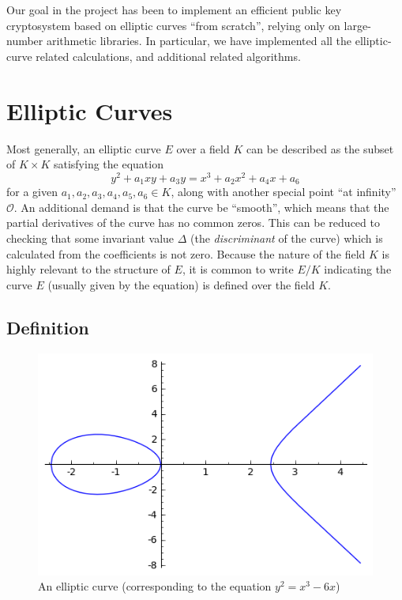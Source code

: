 \documentclass[11pt,english]{article}
\begin{document}
Our goal in the project has been to implement an efficient public key cryptosystem based on elliptic curves ``from scratch'', relying only on large-number arithmetic
libraries. In particular, we have implemented all the elliptic-curve related calculations, and additional related algorithms.

\section{Elliptic Curves}
Most generally, an elliptic curve $E$ over a field $K$ can be described as the subset of $K\times K$ satisfying the equation $$y^2+a_1xy+a_3y=x^3+a_2x^2+a_4x+a_6$$ 
for a given $a_1,a_2,a_3,a_4,a_5,a_6\in K$, along with another special point ``at infinity'' $\mathcal{O}$. An additional demand is that the curve be ``smooth'',
which means that the partial derivatives of the curve has no common zeros. This can be reduced to checking that some invariant value $\Delta$ (the \emph{discriminant} of the curve)
which is calculated from the coefficients is not zero. Because the nature of the field $K$ is highly relevant to the structure of $E$,
it is common to write $E/K$ indicating the curve $E$ (usually given by the equation) is defined over the field $K$.

\subsection{Definition}
\begin{figure}
   \centering
   \includegraphics[scale = 0.5]{ec.png}
   \caption{An elliptic curve (corresponding to the equation $y^2=x^3-6x$)}
\end{figure}
\end{document}
